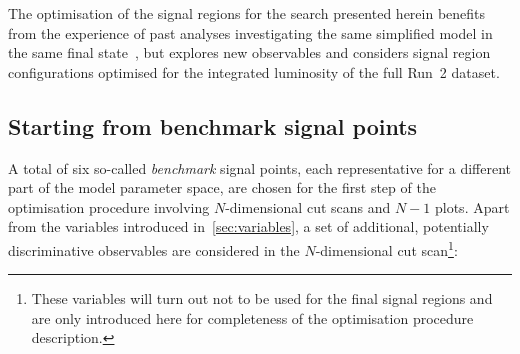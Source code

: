 The optimisation of the signal regions for the \onelepton search presented herein benefits from the experience of past analyses investigating the same simplified model in the same final state~\cite{SUSY-2013-23,SUSY-2017-01}, but explores new observables and considers signal region configurations optimised for the integrated luminosity of the full Run~2 dataset. 

\subsection{Starting from benchmark signal points}

A total of six so-called \textit{benchmark} signal points, each representative for a different part of the model parameter space, are chosen for the first step of the optimisation procedure involving $N$-dimensional cut scans and $N-1$ plots.
Apart from the variables introduced in~\cref{sec:variables}, a set of additional, potentially discriminative observables are considered in the $N$-dimensional cut scan\footnote{These variables will turn out not to be used for the final signal regions and are only introduced here for completeness of the optimisation procedure description.}:
